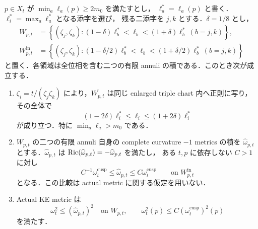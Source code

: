 \begin{lemma}[最大深度を従属にする小さい相対積窓]
\label{coarse:lem:triple-relative-window}
$p\in X_t$ が $\min_a\ell_a(p)\ge2m_0$ を満たすとし，
$\ell_a^*=\ell_a(p)$ と書く．$\ell_i^*=\max_a\ell_a^*$ となる添字を選び，
残る二添字を $j,k$ とする．$\delta=1/8$ とし，
\begin{align}
 W_{p,t}
  &=\left\{(\zeta_j,\zeta_k):
       (1-\delta)\ell_b^*<\ell_b<(1+\delta)\ell_b^*
       \ (b=j,k)\right\},
       \label{coarse:eq:triple-relative-window}\\
 W_{p,t}^{\mathrm{in}}
  &=\left\{(\zeta_j,\zeta_k):
       (1-\delta/2)\ell_b^*<\ell_b<(1+\delta/2)\ell_b^*
       \ (b=j,k)\right\}
       \label{coarse:eq:triple-relative-inner-window}
\end{align}
と置く．各領域は全位相を含む二つの有限 annuli の積である．このとき次が成立する．
\begin{enumerate}[label=\textup{(S\arabic*)}]
\item $\zeta_i=t/(\zeta_j\zeta_k)$ により，$\overline{W_{p,t}}$ は同じ enlarged triple chart
内へ正則に写り，その全体で
\begin{equation}\label{coarse:eq:relative-dependent-depth}
 (1-2\delta)\ell_i^*\le\ell_i\le(1+2\delta)\ell_i^*
\end{equation}
が成り立つ．特に $\min_a\ell_a>m_0$ である．
\item $W_{p,t}$ の二つの有限 annuli 自身の complete curvature $-1$ metrics の積を
$\widehat\omega_{p,t}$ とする．$\widehat\omega_{p,t}$ は
$\operatorname{Ric}(\widehat\omega_{p,t})=-\widehat\omega_{p,t}$ を満たし，
ある $t,p$ に依存しない $C>1$ に対し
\begin{equation}\label{coarse:eq:relative-window-tensor-comparison}
 C^{-1}\omega_t^{\mathrm{cusp}}
 \le\widehat\omega_{p,t}\le C\omega_t^{\mathrm{cusp}}
 \qquad\text{on }W_{p,t}^{\mathrm{in}}
\end{equation}
となる．この比較は actual metric に関する仮定を用いない．
\item Actual KE metric は
\begin{equation}\label{coarse:eq:relative-window-volume-upper}
 \omega_t^2\le(\widehat\omega_{p,t})^2
 \quad\text{on }W_{p,t},
 \qquad
 \omega_t^2(p)\le C(\omega_t^{\mathrm{cusp}})^2(p)
\end{equation}
を満たす．
\end{enumerate}
\end{lemma}

